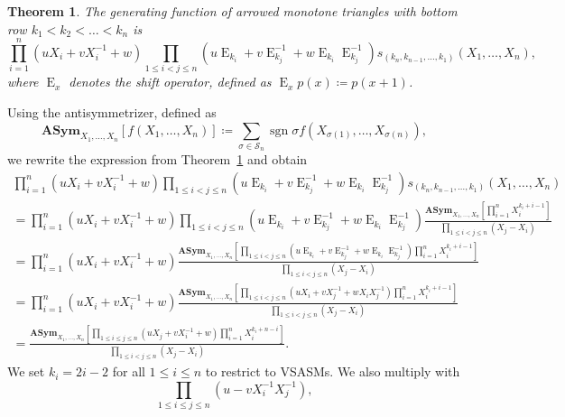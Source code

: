 \documentclass[12pt]{amsart}
\newtheorem{theorem}{Theorem}[section]
\theoremstyle{definition}
\numberwithin{equation}{section}
\DeclareMathOperator{\sgn}{sgn}
\newcommand{\e}{{\operatorname{E}}}
\newcommand{\asym}{\mathbf{ASym}}
\begin{document}
\begin{theorem} 
\label{robbins}
The generating function of arrowed monotone triangles with bottom row $k_1 <  k_2 < \ldots < k_n$ 
is 
\begin{equation*}
\prod_{i=1}^{n} (u X_i + v X_i^{-1} + w) 
\prod_{1 \le i < j \le n} \left( u  \e_{k_i} + v \e_{k_j}^{-1} + w \e_{k_i} \e_{k_j}^{-1}  \right) 
s_{(k_n,k_{n-1},\ldots,k_1)}(X_1,\ldots,X_n), 
\end{equation*}
where $\e_x$ denotes the \emph{shift operator}, defined as $\e_x p(x) \coloneq p(x+1)$. 
\end{theorem} 
Using the antisymmetrizer, defined as 
\begin{equation*}
\asym_{X_1,\ldots,X_n} \left[ f(X_{1},\ldots,X_{n}) \right] \coloneq \sum_{\sigma \in {\mathcal S}_n}  \sgn \sigma 
f(X_{\sigma(1)},\ldots,X_{\sigma(n)}), 
\end{equation*}
we rewrite the expression from Theorem~\ref{robbins} and obtain
\begin{multline}
\label{eq:antisymformula}
\prod_{i=1}^{n} (u  X_i + v  X_i^{-1}+w) \prod_{1 \le i < j \le n} \left( u  \e_{k_i} + v  \e_{k_j}^{-1} + w  \e_{k_i} \e_{k_j}^{-1} \right) 
s_{(k_n,k_{n-1},\ldots,k_1)}(X_1,\ldots,X_n) \\
= \prod_{i=1}^{n} (u  X_i + v  X_i^{-1}+w) \prod_{1 \le i < j \le n} \left( u  \e_{k_i} + v  \e_{k_j}^{-1} + w  \e_{k_i} \e_{k_j}^{-1} \right)
\frac{\asym_{X_1,\ldots,X_n} \left[ \prod_{i=1}^{n} X_i^{k_i+i-1} \right] }{\prod_{1 \le i < j \le n} (X_j - X_i)} \\ 
= \prod_{i=1}^{n} (u  X_i + v  X_i^{-1}+w)  \frac{\asym_{X_1,\ldots,X_n} \left[ \prod_{1 \le i < j \le n} \left( u  \e_{k_i} + v  \e_{k_j}^{-1} + w  \e_{k_i} \e_{k_j}^{-1} \right) \prod_{i=1}^{n} X_i^{k_i+i-1} \right] }{\prod_{1 \le i < j \le n} (X_j - X_i)} \\ 
= \prod_{i=1}^{n} (u  X_i + v  X_i^{-1}+w) \frac{\asym_{X_1,\ldots,X_n} \left[ \prod_{1 \le i <  j \le n} \left( u X_i  + v  X_j^{-1} + w  X_i X_j^{-1} \right) \prod_{i=1}^{n} X_i^{k_i+i-1} \right] }{\prod_{1 \le i < j \le n} (X_j - X_i)} \\
=  \frac{\asym_{X_1,\ldots,X_n} \left[ \prod_{1 \le i \le j \le n} \left( u  X_j + v  X_i^{-1}  + w  \right) \prod_{i=1}^{n} X_i^{k_i+n-i} \right] }{\prod_{1 \le i < j \le n} (X_j - X_i)}.
\end{multline} 
We set $k_i=2i-2$ for all $1\le i \le n$ to restrict to VSASMs. We also multiply with 
\begin{equation}
\label{Bfactor}  
\prod_{1 \le i \le j \le n} \left( u - v X_i^{-1} X_j^{-1}  \right),  
\end{equation} 
\end{document}

